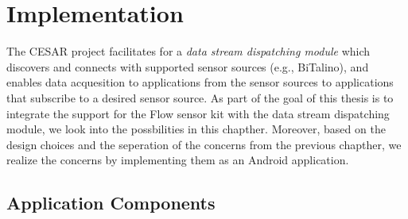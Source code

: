 \chapter{Implementation}


The CESAR project facilitates for a \textit{data stream dispatching module} which discovers and connects with supported sensor sources (e.g., BiTalino), and enables data acquesition to applications from the sensor sources to applications that subscribe to a desired sensor source. As part of the goal of this thesis is to integrate the support for the Flow sensor kit with the data stream dispatching module, we look into the possbilities in this chapther. Moreover, based on the design choices and the seperation of the concerns from the previous chapther, we realize the concerns by implementing them as an Android application. 

\section{Application Components}

